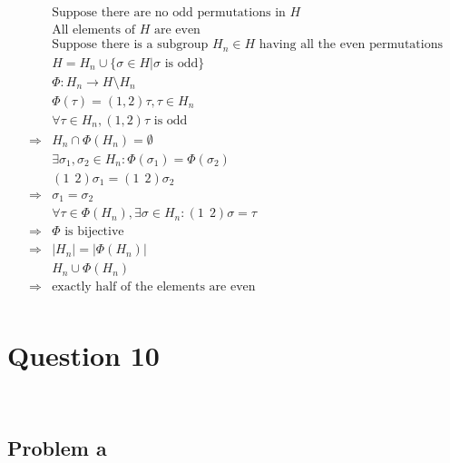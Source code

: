 \documentclass{article}
\begin{document}
\begin{equation*}
    \begin{split}
        &\text{Suppose there are no odd permutations in } H\\
        &\text{All elements of }H \text{ are even}\\
        &\text{Suppose there is a subgroup } H_n\in H\text{ having all the even permutations}\\
        &H=H_n\cup\{\sigma\in H|\sigma\text{ is odd}\}\\
        &\Phi:H_n\rightarrow H\setminus H_n\\
        &\Phi(\tau)=(1,2)\tau,\tau\in H_n\\
        &\forall \tau\in H_n,(1,2)\tau\text{ is odd}\\
        \Rightarrow&H_n\cap\Phi(H_n)=\emptyset\\
        &\exists\sigma_1,\sigma_2\in H_n:\Phi(\sigma_1)=\Phi(\sigma_2)\\
        &(1\ \ 2)\sigma_1=(1\ \ 2)\sigma_2\\
        \Rightarrow&\sigma_1=\sigma_2\\
        &\forall \tau\in \Phi(H_n),\exists \sigma\in H_n:(1\ \ 2)\sigma=\tau\\
        \Rightarrow&\Phi\text{ is bijective}\\
        \Rightarrow&|H_n|=|\Phi(H_n)|\\
        &H_n\cup\Phi(H_n)\\
        \Rightarrow&\text{exactly half of the elements are even}\\
    \end{split}
\end{equation*}

\newpage

\section*{Question 10}

~

\subsection*{Problem a}

~
\end{document}

